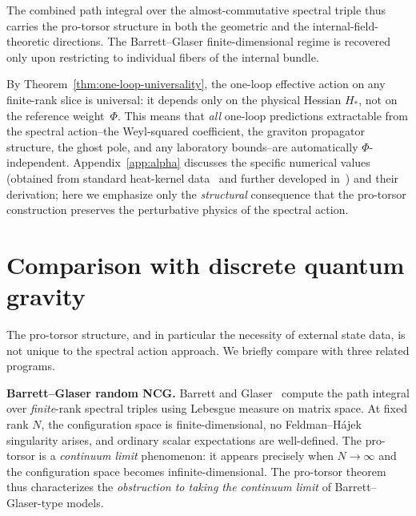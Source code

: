 \documentclass[12pt,a4paper]{article}
\theoremstyle{plain}
\theoremstyle{definition}
\theoremstyle{remark}
\begin{document}
The combined path integral over the almost-commutative spectral triple
thus carries the pro-torsor structure in both the geometric and the
internal-field-theoretic directions.  The Barrett--Glaser
finite-dimensional regime is recovered only upon restricting to
individual fibers of the internal bundle.

By Theorem~\ref{thm:one-loop-universality}, the one-loop effective
action on any finite-rank slice is universal: it depends only on the
physical Hessian $H_*$, not on the reference weight~$\Phi$.  This
means that \emph{all} one-loop predictions extractable from the
spectral action--the Weyl-squared coefficient, the graviton
propagator structure, the ghost pole, and any laboratory
bounds--are automatically $\Phi$-independent.
Appendix~\ref{app:alpha} discusses the specific numerical values
(obtained from standard
heat-kernel data~\cite{Vassilevich:2003,CPR:2009,CZ:2013} and
further developed in~\cite{Alfyorov:2026ff,Alfyorov:2026ss}) and
their derivation; here we emphasize only the \emph{structural}
consequence that the pro-torsor construction preserves the
perturbative physics of the spectral action.


\section{Comparison with discrete quantum gravity}
\label{sec:comparison}

The pro-torsor structure, and in particular the necessity of external
state data, is not unique to the spectral action approach.  We briefly
compare with three related programs.

\medskip

\noindent\textbf{Barrett--Glaser random NCG.}\quad
Barrett and Glaser~\cite{BarrettGlaser:2016} compute the path integral
over \emph{finite}-rank spectral triples using Lebesgue measure on
matrix space.  At fixed rank $N$, the configuration space is
finite-dimensional, no Feldman--H\'ajek singularity arises, and
ordinary scalar expectations are well-defined.  The pro-torsor is a
\emph{continuum limit} phenomenon: it appears precisely when $N \to
\infty$ and the configuration space becomes infinite-dimensional.
The pro-torsor theorem thus characterizes the \emph{obstruction to
taking the continuum limit} of Barrett--Glaser-type models.

\medskip
\end{document}
